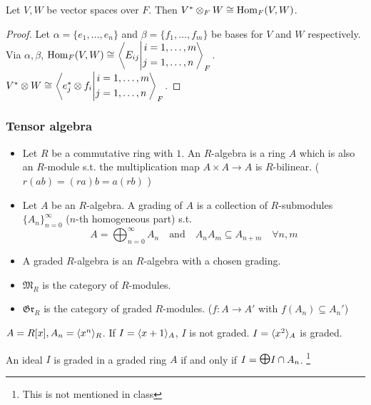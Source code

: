 Let $V, W$ be vector spaces over $F$. Then
$V^* \otimes_F W \cong \Hom_F(V, W)$.
\begin{proof}
  Let $\alpha = \{e_1, \dots, e_n\}$ and $\beta = \{f_1,\dots, f_m\}$ be
  bases for $V$ and $W$ respectively.
  Via $\alpha, \beta$, $\Hom_F(V, W) \cong
  \gen*{E_{ij} \middle|
  \begin{aligned}i &= 1,\dots,m\\j &= 1,\dots,n\end{aligned}}_F$.
  $V^* \otimes W \cong
  \gen*{e_j^* \otimes f_i \middle|
  \begin{aligned}i &= 1,\dots,m\\j &= 1,\dots,n\end{aligned}}_F$.
\end{proof}

\subsubsection{Tensor algebra}
\begin{definition} \mbox{}
  \begin{itemize}
    \item Let $R$ be a commutative ring with $1$.
      An $R$-algebra is a ring $A$ which is also an $R$-module s.t. the
      multiplication map $A \times A \to A$ is $R$-bilinear.
      ( $r(ab) = (ra)b = a(rb)$ )
    \item Let $A$ be an $R$-algebra. A grading of $A$ is a collection of
      $R$-submodules $\{ A_n \}_{n=0}^\infty$ ($n$-th homogeneous part) s.t.
      \[
        A = \bigoplus_{n=0}^\infty A_n \quad \text{and} \quad
        A_nA_m \subseteq A_{n+m} \quad \forall n,m
      \]
    \item A graded $R$-algebra is an $R$-algebra with a chosen grading.
    \item $\mathfrak{M}_R$ is the category of $R$-modules.
    \item $\mathfrak{Gr}_R$ is the category of graded $R$-modules.
      ($f: A \to A'$ with $f(A_n) \subseteq A_n'$)
  \end{itemize}
\end{definition}

\begin{example}
  $A = R[x], A_n = \gen{x^n}_R$. If $I = \gen{x+1}_A$, $I$ is not graded.
  $I = \gen{x^2}_A$ is graded.
\end{example}

\begin{definition}
  \color{red}
  An ideal $I$ is graded in a graded ring $A$ if and only if
  $I = \raisebox{0.3ex}{$\bigoplus$} I \cap A_n$.
  \footnote{This is not mentioned in class}
\end{definition}

